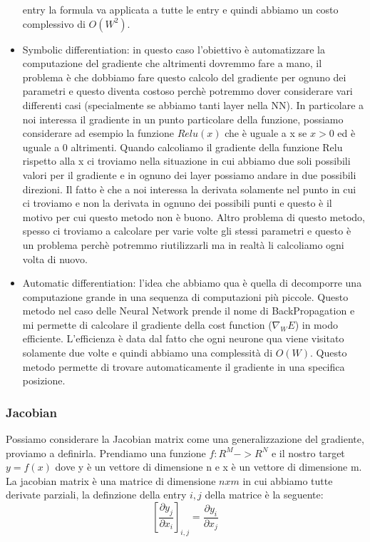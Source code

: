 \documentclass[14pt]{extreport}
\begin{document}
\begin{itemize}
entry la formula va applicata a tutte le entry e quindi abbiamo un costo complessivo di $O(W^2)$.
\item Symbolic differentiation: in questo caso l'obiettivo è automatizzare la computazione del gradiente che altrimenti dovremmo fare a mano, il
problema è che dobbiamo fare questo calcolo del gradiente per ognuno dei parametri e questo diventa costoso perchè potremmo dover considerare vari
differenti casi (specialmente se abbiamo tanti layer nella NN). In particolare a noi interessa il gradiente in un punto particolare della funzione,
possiamo considerare ad esempio la funzione $Relu(x)$ che è uguale a x se $x>0$ ed è uguale a 0 altrimenti. Quando calcoliamo il gradiente della
funzione Relu rispetto alla x ci troviamo nella situazione in cui abbiamo due soli possibili valori per il gradiente e in ognuno dei layer possiamo
andare in due possibili direzioni. Il fatto è che a noi interessa la derivata solamente nel punto in cui ci troviamo e non la derivata in ognuno dei
possibili punti e questo è il motivo per cui questo metodo non è buono. Altro problema di questo metodo, spesso ci troviamo a calcolare per varie
volte gli stessi parametri e questo è un problema perchè potremmo riutilizzarli ma in realtà li calcoliamo ogni volta di nuovo.
\item Automatic differentiation: l'idea che abbiamo qua è quella di decomporre una computazione grande in una sequenza di computazioni più piccole.
Questo metodo nel caso delle Neural Network prende il nome di BackPropagation e mi permette di calcolare il gradiente della cost function ($\nabla_W
E$) in modo efficiente. L'efficienza è data dal fatto che ogni neurone qua viene visitato solamente due volte e quindi abbiamo una complessità di
$O(W)$. Questo metodo permette di trovare automaticamente il gradiente in una specifica posizione.
\end{itemize}

\subsubsection{Jacobian}

Possiamo considerare la Jacobian matrix come una generalizzazione del gradiente, proviamo a definirla. Prendiamo una funzione $f: R^M -> R^N$ e il
nostro target $y = f(x)$ dove y è un vettore di dimensione n e x è un vettore di dimensione m. La jacobian matrix è una matrice di dimensione $nxm$ in
cui abbiamo tutte derivate parziali, la definzione della entry $i,j$ della matrice è la seguente:
$$[\frac{\partial y_j}{\partial x_i}]_{i,j} = \frac{\partial y_i}{\partial x_j}$$
\end{document}
